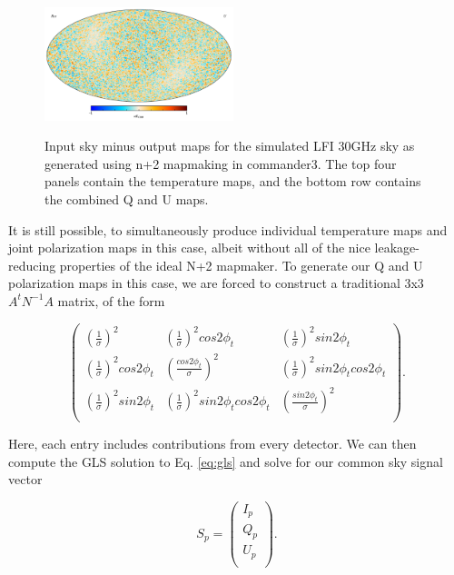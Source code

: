 \documentclass{aa}
\begin{document}
\begin{figure}
  \includegraphics[width=0.49\textwidth]{figs/sim_diff_U.pdf}\\
  \caption{Input sky minus output maps for the simulated LFI 30GHz sky as generated using n+2 mapmaking in commander3. The top four panels contain the temperature maps, and the bottom row contains the combined Q and U maps.}
  \label{fig:sim_diff}
\end{figure}

It is still possible, to simultaneously produce individual temperature maps and joint polarization maps in this case, albeit without all of the nice leakage-reducing properties of the ideal N+2 mapmaker. To generate our Q and U polarization maps in this case, we are forced to construct a traditional 3x3 $A^t N^{-1}A$ matrix, of the form

\begin{equation}
\begin{pmatrix}
(\frac{1}{\sigma})^2 &
(\frac{1}{\sigma})^2 cos2\phi_t & (\frac{1}{\sigma})^2 sin2\phi_t \\

(\frac{1}{\sigma})^2 cos2\phi_t & 
(\frac{cos 2\phi_t}{\sigma})^2 & (\frac{1}{\sigma})^2 sin2\phi_t cos2\phi_t \\

(\frac{1}{\sigma})^2 sin2\phi_t & 
(\frac{1}{\sigma})^2 sin2\phi_t cos2\phi_t &(\frac{ sin 2\phi_t}{\sigma})^2
\\
\end{pmatrix}
.
\end{equation}

Here, each entry includes contributions from every detector. We can then compute the GLS solution to Eq. \ref{eq:gls} and solve for our common sky signal vector 

\begin{equation}
S_p = \begin{pmatrix}
I_p\\
Q_p\\
U_p\\
\end{pmatrix}.
\end{equation}
\end{document}
